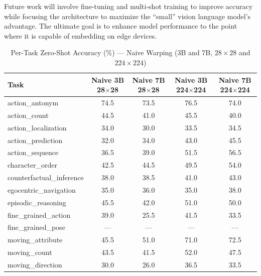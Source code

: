 \documentclass[conference]{IEEEtran}
\begin{document}
Future work will involve fine-tuning and multi-shot training to improve
accuracy while focusing the architecture to maximize the ``small'' vision
language model's advantage. The ultimate goal is to enhance model
performance to the point where it is capable of embedding on edge devices.


\begin{table}[!t]
  \centering
  \caption{Per-Task Zero-Shot Accuracy (\%) --- Naive Warping (3B and 7B,
           $28{\times}28$ and $224{\times}224$)}
  \label{tab:naive_acc}
  \begin{tabular}{lcccc}
    \toprule
    \textbf{Task}
      & \textbf{Naive 3B 28$\times$28}
      & \textbf{Naive 7B 28$\times$28}
      & \textbf{Naive 3B 224$\times$224}
      & \textbf{Naive 7B 224$\times$224} \\
    \midrule
    action\_antonym            & 74.5 & 73.5 & 76.5 & 74.0  \\
    action\_count              & 44.5 & 41.0 & 45.5 & 40.0  \\
    action\_localization       & 34.0 & 30.0 & 33.5 & 34.5  \\
    action\_prediction         & 32.0 & 34.0 & 43.0 & 45.5  \\
    action\_sequence           & 36.5 & 39.0 & 51.5 & 56.5  \\
    character\_order           & 42.5 & 44.5 & 49.5 & 54.0  \\
    counterfactual\_inference  & 38.0 & 38.5 & 41.0 & 43.0  \\
    egocentric\_navigation     & 35.0 & 36.0 & 35.0 & 38.0  \\
    episodic\_reasoning        & 45.5 & 42.0 & 51.0 & 50.0  \\
    fine\_grained\_action      & 39.0 & 25.5 & 41.5 & 33.5  \\
    fine\_grained\_pose        & ---  & ---  & ---  & ---   \\
    moving\_attribute          & 45.5 & 51.0 & 71.0 & 72.5  \\
    moving\_count              & 43.5 & 41.5 & 52.0 & 47.5  \\
    moving\_direction          & 30.0 & 26.0 & 36.5 & 33.5  \\

\end{tabular}
\end{table}
\end{document}
